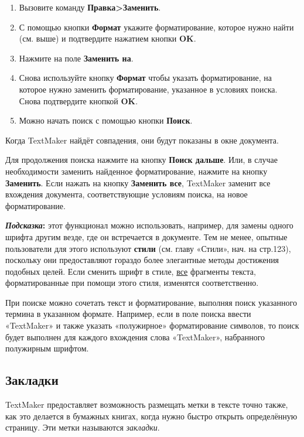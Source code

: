 \documentclass[a4paper,10pt]{article}
\begin{document}
\begin{enumerate}
 \item Вызовите команду \textbf{Правка>Заменить}.
 \item С помощью кнопки \textbf{Формат} укажите форматирование, которое нужно найти (см. выше) и подтвердите нажатием кнопки \textbf{OK}.
 \item Нажмите на поле \textbf{Заменить на}.
 \item Снова используйте кнопку \textbf{Формат} чтобы указать форматирование, на которое нужно заменить форматирование, указанное в условиях поиска. Снова подтвердите кнопкой \textbf{OK}.
 \item Можно начать поиск с  помощью кнопки \textbf{Поиск}.
\end{enumerate}

Когда TextMaker найдёт совпадения, они будут показаны в окне документа.

Для продолжения поиска нажмите на кнопку \textbf{Поиск дальше}. Или, в случае необходимости заменить найденное форматирование, нажмите на кнопку \textbf{Заменить}. Если нажать на кнопку \textbf{Заменить все}, TextMaker заменит все вхождения документа, соответствующие условиям поиска, на новое форматирование.

\begin{mdframed}[backgroundcolor=blue!10]
\textbf{\textit{Подсказка}:} этот функционал можно использовать, например, для замены одного шрифта другим везде, где он встречается в документе. Тем не менее, опытные пользователи для этого используют \textbf{стили} (см. главу «Стили», нач. на стр.123), поскольку они предоставляют гораздо более элегантные методы достижения подобных целей. Если сменить шрифт в стиле, \underline{все} фрагменты текста, форматированные при помощи этого стиля, изменятся соответственно.
\end{mdframed}

При поиске можно сочетать текст и форматирование, выполняя поиск указанного термина в указанном формате. Например, если в поле поиска ввести «TextMaker» и также указать «полужирное» форматирование символов, то поиск будет выполнен для каждого вхождения слова «TextMaker», набранного полужирным шрифтом.

\subsection{Закладки}
TextMaker предоставляет возможность размещать метки в тексте точно также, как это делается в бумажных книгах, когда нужно быстро открыть определённую страницу. Эти метки называются \textit{закладки}.
\end{document}
